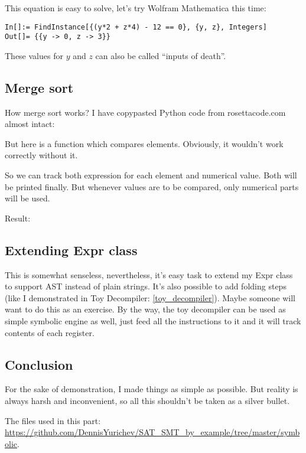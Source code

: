 This equation is easy to solve, let's try Wolfram Mathematica this time:

\begin{lstlisting}
In[]:= FindInstance[{(y*2 + z*4) - 12 == 0}, {y, z}, Integers]
Out[]= {{y -> 0, z -> 3}}
\end{lstlisting}

These values for $y$ and $z$ can also be called ``inputs of death''.

\subsection{Merge sort}

How merge sort works?
I have copypasted Python code from rosettacode.com almost intact:



But here is a function which compares elements.
Obviously, it wouldn't work correctly without it.

So we can track both expression for each element and numerical value.
Both will be printed finally.
But whenever values are to be compared, only numerical parts will be used.

Result:



\subsection{Extending Expr class}

This is somewhat senseless, nevertheless, it's easy task to extend my Expr class to support \ac{AST} instead of
plain strings.
It's also possible to add folding steps (like I demonstrated in Toy Decompiler: \ref{toy_decompiler}).
Maybe someone will want to do this as an exercise.
By the way, the toy decompiler can be used as simple symbolic engine as well,
just feed all the instructions to it and it will track contents of each register.

\subsection{Conclusion}

For the sake of demonstration, I made things as simple as possible.
But reality is always harsh and inconvenient, so all this shouldn't be taken as a silver bullet.

The files used in this part: \url{https://github.com/DennisYurichev/SAT_SMT_by_example/tree/master/symbolic}.

